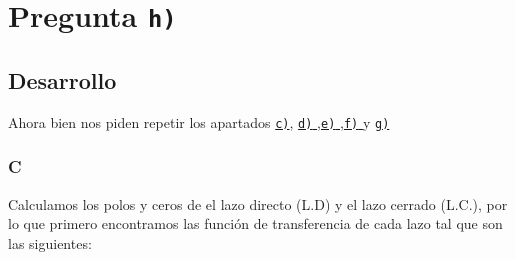 \section{Pregunta \texttt{h)}}\label{pregunta-h}
\subsection{Desarrollo}

Ahora bien nos piden repetir los apartados \hyperref[pregunta-c]{\texttt{c)}}, \hyperref[pregunta-d]{\texttt{d)} },\hyperref[pregunta-e]{\texttt{e)} },\hyperref[pregunta-f]{\texttt{f)} } y \hyperref[pregunta-g]{\texttt{g)}}

\subsubsection{C} %
Calculamos los polos y ceros de el lazo directo (L.D) 
y el lazo cerrado (L.C.), por lo que primero encontramos las función de 
transferencia de cada lazo tal que son las siguientes:

